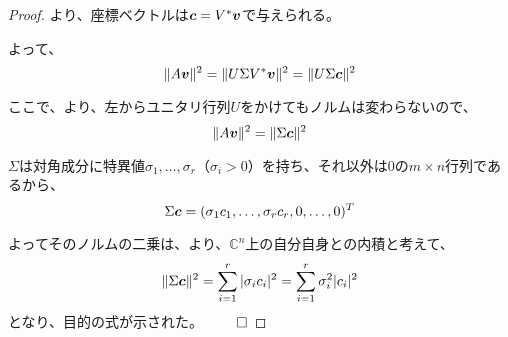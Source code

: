 \documentclass[../../../topic_linear-algebra]{subfiles}
\begin{document}
\begin{proof}
  より、座標ベクトルは$\vb*{c} = V^* \vb*{v}$で与えられる。

  よって、
  \begin{equation*}
    \| A \vb*{v} \|^2 = \| U \Sigma V^* \vb*{v} \|^2 = \| U \Sigma \vb*{c} \|^2
  \end{equation*}

  ここで、より、左からユニタリ行列$U$をかけてもノルムは変わらないので、
  \begin{equation*}
    \| A \vb*{v} \|^2 = \| \Sigma \vb*{c} \|^2
  \end{equation*}
  
  $\Sigma$は対角成分に特異値$\sigma_1, \dots, \sigma_r$（$\sigma_i > 0$）を持ち、それ以外は0の$m \times n$行列であるから、
  \begin{equation*}
    \Sigma \vb*{c} = (\sigma_1 c_1, \dots, \sigma_r c_r, 0, \dots, 0)^T
  \end{equation*}
  
  よってそのノルムの二乗は、より、$\mathbb{C}^n$上の自分自身との内積と考えて、
  \begin{equation*}
    \| \Sigma \vb*{c} \|^2 = \sum_{i=1}^r |\sigma_i c_i|^2 = \sum_{i=1}^r \sigma_i^2 |c_i|^2
  \end{equation*}
  となり、目的の式が示された。 $\qed$
\end{proof}
\end{document}
